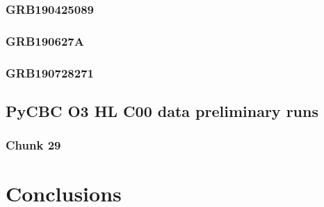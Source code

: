 \documentclass[binding=0.6cm, LaM]{sapthesis}
\begin{document}
\subsection{GRB190425089}

\subsection{GRB190627A}

\subsection{GRB190728271}

\section{PyCBC O3 HL C00 data preliminary runs}

\subsection{Chunk 29}

\chapter{Conclusions}


\backmatter
\cleardoublepage


\begin{thebibliography}{100}
\end{thebibliography}

\printbibliography
\end{document}

